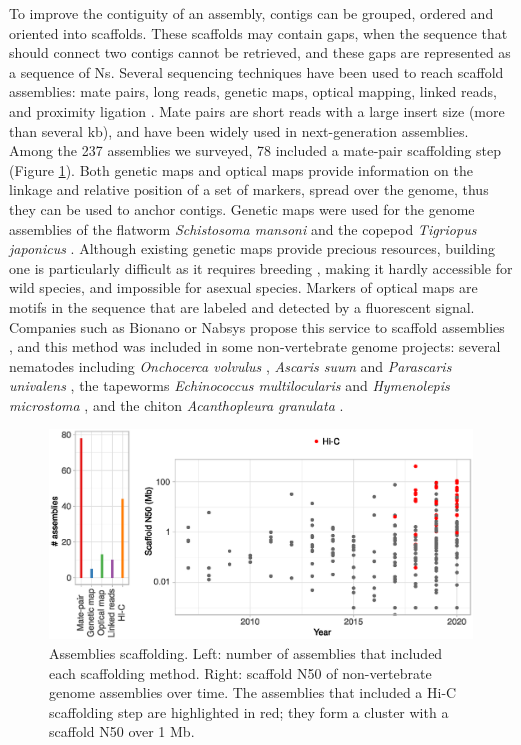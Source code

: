 To improve the contiguity of an assembly, contigs can be grouped, ordered and oriented into scaffolds. These scaffolds may contain gaps, when the sequence that should connect two contigs cannot be retrieved, and these gaps are represented as a sequence of Ns. Several sequencing techniques have been used to reach scaffold assemblies: mate pairs, long reads, genetic maps, optical mapping, linked reads, and proximity ligation \cite{ghurye2019modern}. Mate pairs are short reads with a large insert size (more than several kb), and have been widely used in next-generation assemblies. Among the 237 assemblies we surveyed, 78 included a mate-pair scaffolding step (Figure \ref{fig:hic}). Both genetic maps \cite{genetic_maps} and optical maps \cite{optical_maps} provide information on the linkage and relative position of a set of markers, spread over the genome, thus they can be used to anchor contigs. Genetic maps were used for the genome assemblies of the flatworm \textit{Schistosoma mansoni} \cite{schistosoma_mansoni2} and the copepod \textit{Tigriopus japonicus} \cite{tigriopus_japonicus}. Although existing genetic maps provide precious resources, building one is particularly difficult as it requires breeding \cite{genetic_maps}, making it hardly accessible for wild species, and impossible for asexual species. Markers of optical maps are motifs in the sequence that are labeled and detected by a fluorescent signal. Companies such as Bionano or Nabsys propose this service to scaffold assemblies \cite{optical_scaffolding}, and this method was included in some non-vertebrate genome projects: several nematodes including \textit{Onchocerca volvulus} \cite{onchocerca_volvulus}, \textit{Ascaris suum} and \textit{Parascaris univalens} \cite{ascaris_suum2}, the tapeworms \textit{Echinococcus multilocularis} \cite{echinococcus_multilocularis} and \textit{Hymenolepis microstoma} \cite{hymenolepis_microstoma2}, and the chiton \textit{Acanthopleura granulata} \cite{acanthopleura_granulata}. \\

\begin{figure}
    \centering
    \includegraphics[width=\textwidth]{fig/review_scaffolding.eps}
    \caption{Assemblies scaffolding. Left: number of assemblies that included each scaffolding method. Right: scaffold N50 of non-vertebrate genome assemblies over time. The assemblies that included a Hi-C scaffolding step are highlighted in red; they form a cluster with a scaffold N50 over 1 Mb.}
    \label{fig:hic}
\end{figure}

